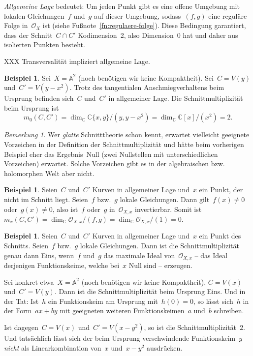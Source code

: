 \documentclass[a4paper,ngerman,12pt]{scrartcl}
\theoremstyle{definition}
\newtheorem{ex}[defn]{Beispiel}
\theoremstyle{plain}
\theoremstyle{remark}
\newtheorem{rem}[defn]{Bemerkung}
\renewcommand{\AA}{\mathbb{A}}
\newcommand{\CC}{\mathbb{C}}
\renewcommand{\O}{\mathcal{O}}
\begin{document}
\emph{Allgemeine Lage} bedeutet: Um jeden Punkt gibt es eine offene Umgebung
mit lokalen Gleichungen~$f$ und~$g$ auf dieser Umgebung, sodass~$(f,g)$ eine
reguläre Folge in~$\O_X$ ist (siehe Fußnote~\ref{fn:regulaere-folge}). Diese
Bedingung garantiert, dass der Schnitt~$C \cap C'$ Kodimension~2, also
Dimension~0 hat und daher aus isolierten Punkten besteht.

XXX Transversalität impliziert allgemeine Lage.

\begin{ex}Sei~$X = \AA^2$ (noch benötigen wir keine Kompaktheit). Sei~$C = V(y)$
und~$C' = V(y-x^2)$. Trotz des tangentialen Anschmiegverhaltens beim Ursprung
befinden sich~$C$ und~$C'$ in allgemeiner Lage. Die Schnittmultiplizität beim
Ursprung ist
\[ m_0(C,C') = \dim_\CC \CC\{x,y\}/(y,y-x^2) = \dim_\CC \CC[x]/(x^2) =
2. \]\end{ex}

\begin{rem}Wer \emph{glatte} Schnitttheorie schon kennt, erwartet vielleicht geeignete
Vorzeichen in der Definition der Schnittmultiplizität und hätte beim vorherigen
Beispiel eher das Ergebnis~Null (zwei Nullstellen mit unterschiedlichen
Vorzeichen) erwartet. Solche Vorzeichen gibt es in der algebraischen bzw.
holomorphen Welt aber nicht.
\end{rem}

\begin{ex}Seien~$C$ und~$C'$ Kurven in allgemeiner Lage und~$x$ ein Punkt, der
nicht im Schnitt liegt. Seien~$f$ bzw.~$g$ lokale Gleichungen. Dann gilt~$f(x)
\neq 0$ oder~$g(x) \neq 0$, also ist~$f$ oder~$g$ in~$\O_{X,x}$ invertierbar.
Somit ist~$m_x(C,C') = \dim_\CC \O_{X,x}/(f,g) = \dim_\CC \O_{X,x}/(1) =
0$.\end{ex}

\begin{ex}Seien~$C$ und~$C'$ Kurven in allgemeiner Lage und~$x$ ein Punkt des
Schnitts. Seien~$f$ bzw.~$g$ lokale Gleichungen. Dann ist die
Schnittmultiplizität genau dann Eins, wenn~$f$ und~$g$ das maximale Ideal
von~$\O_{X,x}$ -- das Ideal derjenigen Funktionskeime, welche bei~$x$
Null sind -- erzeugen.

Sei konkret etwa~$X = \AA^2$ (noch benötigen wir keine
Kompaktheit), $C = V(x)$ und~$C' = V(y)$. Dann ist die Schnittmultiplizität
beim Ursprung Eins. Und in der Tat: Ist~$h$ ein Funktionskeim am
Ursprung mit~$h(0) = 0$, so lässt sich~$h$ in der Form~$ax + by$ mit geeigneten
weiteren Funktionskeimen~$a$ und~$b$ schreiben.

Ist dagegen~$C = V(x)$ und~$C' = V(x - y^2)$, so ist die
Schnittmultiplizität~$2$. Und tatsächlich lässt sich der beim Ursprung
verschwindende Funktionskeim~$y$ \emph{nicht} als Linearkombination von~$x$
und~$x-y^2$ ausdrücken.
\end{ex}
\end{document}

